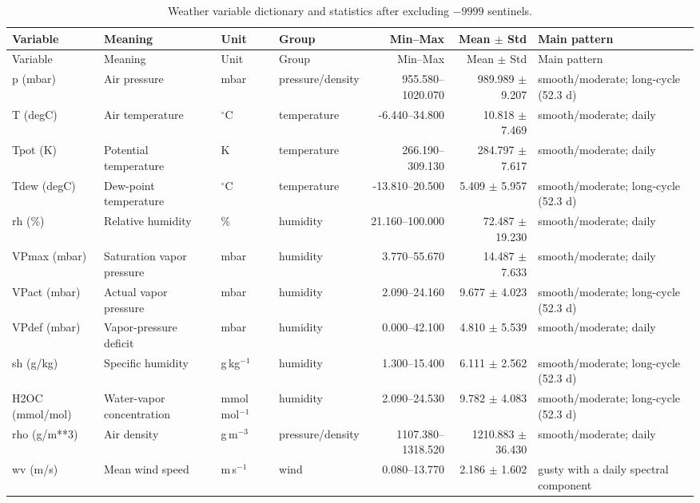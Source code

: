 \documentclass[10pt]{article}
\begin{document}
\scriptsize
\setlength{\tabcolsep}{3pt}
\begin{longtable}{@{}p{}p{}p{}p{}rrp{}@{}}
\caption{Weather variable dictionary and statistics after excluding $-9999$ sentinels.}\label{tab:weather}\\
\toprule
Variable & Meaning & Unit & Group & Min--Max & Mean $\pm$ Std & Main pattern \\
\midrule\endfirsthead
\toprule
Variable & Meaning & Unit & Group & Min--Max & Mean $\pm$ Std & Main pattern \\
\midrule\endhead
p (mbar) & Air pressure & mbar & pressure/density & 955.580--1020.070 & 989.989 $\pm$ 9.207 & smooth/moderate; long-cycle (52.3 d) \\
T (degC) & Air temperature & $^\circ$C & temperature & -6.440--34.800 & 10.818 $\pm$ 7.469 & smooth/moderate; daily \\
Tpot (K) & Potential temperature & K & temperature & 266.190--309.130 & 284.797 $\pm$ 7.617 & smooth/moderate; daily \\
Tdew (degC) & Dew-point temperature & $^\circ$C & temperature & -13.810--20.500 & 5.409 $\pm$ 5.957 & smooth/moderate; long-cycle (52.3 d) \\
rh (\%) & Relative humidity & \% & humidity & 21.160--100.000 & 72.487 $\pm$ 19.230 & smooth/moderate; daily \\
VPmax (mbar) & Saturation vapor pressure & mbar & humidity & 3.770--55.670 & 14.487 $\pm$ 7.633 & smooth/moderate; daily \\
VPact (mbar) & Actual vapor pressure & mbar & humidity & 2.090--24.160 & 9.677 $\pm$ 4.023 & smooth/moderate; long-cycle (52.3 d) \\
VPdef (mbar) & Vapor-pressure deficit & mbar & humidity & 0.000--42.100 & 4.810 $\pm$ 5.539 & smooth/moderate; daily \\
sh (g/kg) & Specific humidity & g\,kg$^{-1}$ & humidity & 1.300--15.400 & 6.111 $\pm$ 2.562 & smooth/moderate; long-cycle (52.3 d) \\
H2OC (mmol/mol) & Water-vapor concentration & mmol\,mol$^{-1}$ & humidity & 2.090--24.530 & 9.782 $\pm$ 4.083 & smooth/moderate; long-cycle (52.3 d) \\
rho (g/m**3) & Air density & g\,m$^{-3}$ & pressure/density & 1107.380--1318.520 & 1210.883 $\pm$ 36.430 & smooth/moderate; daily \\
wv (m/s) & Mean wind speed & m\,s$^{-1}$ & wind & 0.080--13.770 & 2.186 $\pm$ 1.602 & gusty with a daily spectral component \\

\end{longtable}
\end{document}
